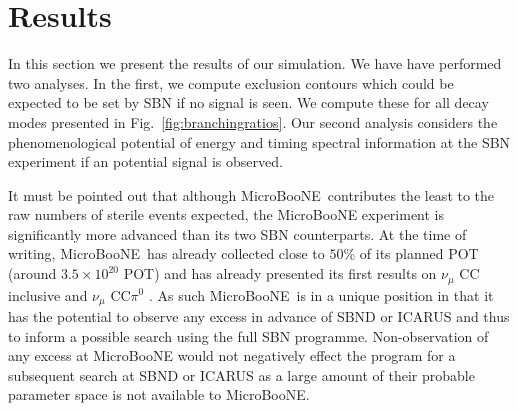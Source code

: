 \documentclass[11pt, a4paper]{article}
\newcommand{\reffig}[1]{Fig.~\ref{#1}}
\def\muboone{MicroBooNE}
\def\ster{\ensuremath N}
\begin{document}
\section{\label{sec:sensitivities}Results}

In this section we present the results of our simulation. We have have
performed two analyses. In the first, we compute exclusion contours which could
be expected to be set by SBN if no signal is seen. We compute these for all
decay modes presented in \reffig{fig:branchingratios}. Our second analysis
considers the phenomenological potential of energy and timing spectral information at the SBN
experiment if an potential signal is observed. 

It must be pointed out that although \muboone\ contributes the least to the raw
numbers of sterile events expected, the MicroBooNE experiment is significantly
more advanced than its two SBN counterparts. At the time of writing, \muboone\
has already collected close to $50$\% of its planned POT (around $3.5\times
10^{20}$ POT) and has already presented its first results on $\nu_\mu$ CC
inclusive and $\nu_\mu$ CC$\pi^0$ \cite{mubooneneutrino}. As such \muboone\ is
in a unique position in that it has the potential to observe any excess in
advance of SBND or ICARUS and thus to inform a possible search using the full
SBN programme.
%
%
Non-observation of any excess at MicroBooNE would not negatively effect the
program for a subsequent search at SBND or ICARUS as a large amount of their
probable parameter space is not available to MicroBooNE.
\end{document}
